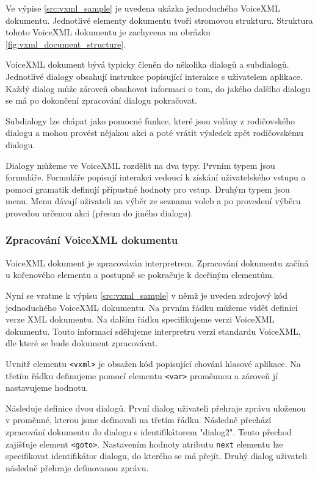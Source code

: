 \documentclass[ing,male,java,dept460]{diploma}						%
\begin{document}

Ve výpise \ref{src:vxml_sample} je uvedena ukázka jednoduchého VoiceXML dokumentu. Jednotlivé elementy dokumentu tvoří stromovou strukturu. Struktura tohoto VoiceXML dokumentu je zachycena na obrázku \ref{fig:vxml_document_structure}.

VoiceXML dokument bývá typicky členěn do několika dialogů a subdialogů. Jednotlivé dialogy obsahují instrukce popisující interakce s uživatelem aplikace. Každý dialog může zároveň obsahovat informaci o tom, do jakého dalšího dialogu se má po dokončení zpracování dialogu pokračovat.

Subdialogy lze chápat jako pomocné funkce, které jsou volány z rodičovského dialogu a mohou provést nějakou akci a poté vrátit výsledek zpět rodičovskému dialogu.

Dialogy můžeme ve VoiceXML rozdělit na dva typy. Prvním typem jsou formuláře. Formuláře popisují interakci vedoucí k získání uživatelského vstupu a pomocí gramatik definují přípustné hodnoty pro vstup. Druhým typem jsou menu. Menu dávají uživateli na výběr ze seznamu voleb a po provedení výběru provedou určenou akci (přesun do jiného dialogu).



\subsubsection{Zpracování VoiceXML dokumentu}
\label{sec:Zpracovani_vxml_dokumentu}
VoiceXML dokument je zpracováván interpretrem. Zpracování dokumentu začíná u kořenového elementu a postupně se pokračuje k dceřiným elementům.

Nyní se vraťme k výpisu \ref{src:vxml_sample} v němž je uveden zdrojový kód jednoduchého VoiceXML dokumentu. Na prvním řádku můžeme vidět definici verze XML dokumentu. Na dalším řádku specifikujeme verzi VoiceXML dokumentu. Touto informací sdělujeme interpretru verzi standardu VoiceXML, dle které se bude dokument zpracovávat.

Uvnitř elementu \texttt{<vxml>} je obsažen kód popisující chování hlasové aplikace. Na třetím řádku definujeme pomocí elementu \texttt{<var>} proměnnou a zároveň jí nastavujeme hodnotu.

Následuje definice dvou dialogů. První dialog uživateli přehraje zprávu uloženou v proměnné, kterou jsme definovali na třetím řádku. Následně přechází zpracování dokumentu do dialogu s identifikátorem "dialog2". Tento přechod zajišťuje element \texttt{<goto>}. Nastavením hodnoty atributu \texttt{next} elementu lze specifikovat identifikátor dialogu, do kterého se má přejít. Druhý dialog uživateli následně přehraje definovanou zprávu.
\end{document}
